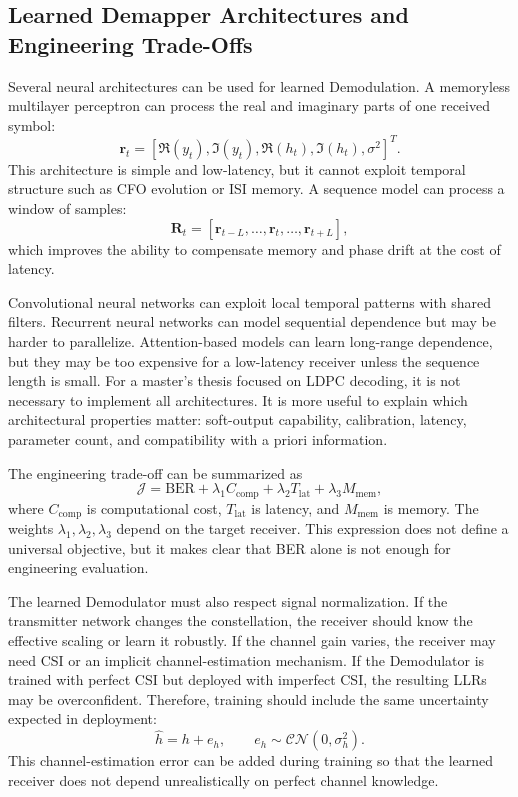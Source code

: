 \subsection{Learned Demapper Architectures and Engineering Trade-Offs}
Several neural architectures can be used for learned Demodulation. A memoryless multilayer perceptron can process the real and imaginary parts of one received symbol:
\begin{equation}
  \mathbf{r}_t=[\Re(y_t),\Im(y_t),\Re(h_t),\Im(h_t),\sigma^2]^T.
\end{equation}
This architecture is simple and low-latency, but it cannot exploit temporal structure such as CFO evolution or ISI memory. A sequence model can process a window of samples:
\begin{equation}
  \mathbf{R}_t=[\mathbf{r}_{t-L},\ldots,\mathbf{r}_t,\ldots,\mathbf{r}_{t+L}],
\end{equation}
which improves the ability to compensate memory and phase drift at the cost of latency.

Convolutional neural networks can exploit local temporal patterns with shared filters. Recurrent neural networks can model sequential dependence but may be harder to parallelize. Attention-based models can learn long-range dependence, but they may be too expensive for a low-latency receiver unless the sequence length is small. For a master's thesis focused on LDPC decoding, it is not necessary to implement all architectures. It is more useful to explain which architectural properties matter: soft-output capability, calibration, latency, parameter count, and compatibility with a priori information.

The engineering trade-off can be summarized as
\begin{equation}
  \mathcal{J}
  =
  \mathrm{BER}
  +\lambda_1 C_{\mathrm{comp}}
  +\lambda_2 T_{\mathrm{lat}}
  +\lambda_3 M_{\mathrm{mem}},
\end{equation}
where $C_{\mathrm{comp}}$ is computational cost, $T_{\mathrm{lat}}$ is latency, and $M_{\mathrm{mem}}$ is memory. The weights $\lambda_1,\lambda_2,\lambda_3$ depend on the target receiver. This expression does not define a universal objective, but it makes clear that BER alone is not enough for engineering evaluation.

The learned Demodulator must also respect signal normalization. If the transmitter network changes the constellation, the receiver should know the effective scaling or learn it robustly. If the channel gain varies, the receiver may need CSI or an implicit channel-estimation mechanism. If the Demodulator is trained with perfect CSI but deployed with imperfect CSI, the resulting LLRs may be overconfident. Therefore, training should include the same uncertainty expected in deployment:
\begin{equation}
  \hat{h}=h+e_h, \qquad e_h\sim\mathcal{CN}(0,\sigma_h^2).
\end{equation}
This channel-estimation error can be added during training so that the learned receiver does not depend unrealistically on perfect channel knowledge.


